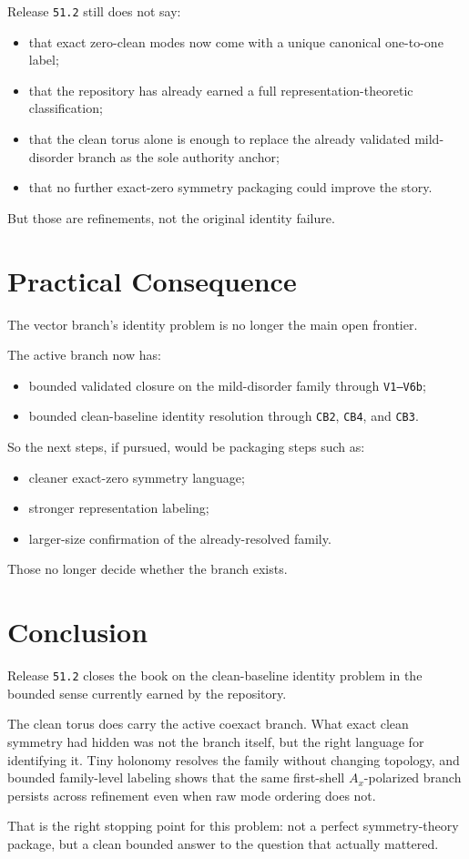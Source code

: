 \documentclass[11pt]{article}
\begin{document}
Release \texttt{51.2} still does not say:
\begin{itemize}
\item that exact zero-clean modes now come with a unique canonical one-to-one label;
\item that the repository has already earned a full representation-theoretic classification;
\item that the clean torus alone is enough to replace the already validated mild-disorder branch as the sole authority anchor;
\item that no further exact-zero symmetry packaging could improve the story.
\end{itemize}

But those are refinements, not the original identity failure.

\section{Practical Consequence}

The vector branch's identity problem is no longer the main open frontier.

The active branch now has:
\begin{itemize}
\item bounded validated closure on the mild-disorder family through \texttt{V1--V6b};
\item bounded clean-baseline identity resolution through \texttt{CB2}, \texttt{CB4}, and \texttt{CB3}.
\end{itemize}

So the next steps, if pursued, would be packaging steps such as:
\begin{itemize}
\item cleaner exact-zero symmetry language;
\item stronger representation labeling;
\item larger-size confirmation of the already-resolved family.
\end{itemize}

Those no longer decide whether the branch exists.

\section{Conclusion}

Release \texttt{51.2} closes the book on the clean-baseline identity problem in the bounded sense currently earned by the repository.

The clean torus does carry the active coexact branch. What exact clean symmetry had hidden was not the branch itself, but the right language for identifying it. Tiny holonomy resolves the family without changing topology, and bounded family-level labeling shows that the same first-shell \(A_x\)-polarized branch persists across refinement even when raw mode ordering does not.

That is the right stopping point for this problem: not a perfect symmetry-theory package, but a clean bounded answer to the question that actually mattered.
\end{document}
